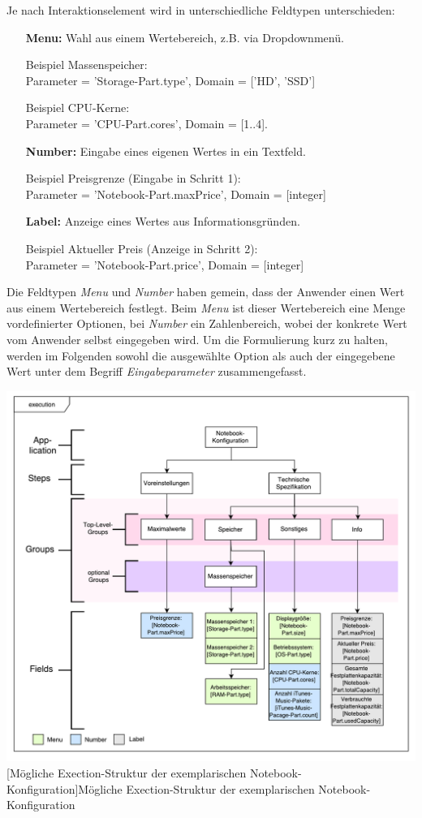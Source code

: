 \documentclass[11pt, a4paper, titlepage, listof=totoc, bibliography=totoc, index=totoc, twoside, openright, headings=normal]{scrreprt}
\begin{document}
\begin{enumerate}[1.]
Je nach Interaktionselement wird in unterschiedliche Feldtypen unterschieden:
\begin{enumerate}[(a)]
\item [\textbf{Menu:}] Wahl aus einem Wertebereich, z.B. via Dropdownmenü.

Beispiel Massenspeicher:\\
Parameter = 'Storage-Part.type',  Domain = ['HD', 'SSD']

Beispiel CPU-Kerne:\\
Parameter = 'CPU-Part.cores', Domain = [1..4].
\item [\textbf{Number:}] Eingabe eines eigenen Wertes in ein Textfeld.

Beispiel Preisgrenze (Eingabe in Schritt 1):\\
 Parameter = 'Notebook-Part.maxPrice', Domain = [integer]
\item [\textbf{Label:}] Anzeige eines Wertes aus Informationsgründen.

Beispiel Aktueller Preis (Anzeige in Schritt 2):\\
Parameter = 'Notebook-Part.price', Domain = [integer]
\end{enumerate}
\end{enumerate}

Die Feldtypen \emph{Menu} und \emph{Number} haben gemein, dass der Anwender einen Wert aus einem Wertebereich festlegt. Beim \emph{Menu} ist dieser Wertebereich eine Menge vordefinierter Optionen, bei \emph{Number} ein Zahlenbereich, wobei der konkrete Wert vom Anwender selbst eingegeben wird. Um die Formulierung kurz zu halten, werden im Folgenden sowohl die ausgewählte Option als auch der eingegebene Wert unter dem Begriff \emph{Eingabeparameter} zusammengefasst.

\begin{minipage}{\linewidth}
	\centering
	\includegraphics[width=0.8\linewidth]{Abbildungen/tactonModellExecutionNotebook.pdf}
	[Mögliche Exection-Struktur der exemplarischen Notebook-Konfiguration]{Mögliche Exection-Struktur der exemplarischen Notebook-Konfiguration}
	\label{fig:tactonModellExecutionNotebook}
\end{minipage}
\vspace{0.3em}
\end{document}
